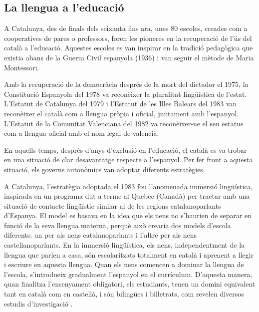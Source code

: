 \begin{multicols}{2}
\subsection{La llengua a l’educació}

A Catalunya, des de finals dels seixanta fins ara, unes 80 escoles, creades com a cooperatives de pares o professors, foren les pioneres en la recuperació de l’ús del català a l’educació. Aquestes escoles es van inspirar en la tradició pedagògica que existia abans de la Guerra Civil espanyola (1936) i van seguir el mètode de Maria Montessori.

Amb la recuperació de la democràcia després de la mort del dictador el 1975, la Constitució Espanyola del 1978 va reconèixer la pluralitat lingüística de l’estat. L’Estatut de Catalunya del 1979 i l’Estatut de les Illes Balears del 1983 van reconèixer el català com a llengua pròpia i oficial, juntament amb l’espanyol. L’Estatut de la Comunitat Valenciana del 1982 va reconèixer-ne el seu estatus com a llengua oficial amb el nom legal de valencià.

En aquells temps, després d’anys d’ex\-clu\-sió en l’educació, el català es va trobar en una situació de clar desavantatge respecte a l’espanyol. Per fer front a aquesta situació, els governs autonòmics van adoptar diferents estratègies.

A Catalunya, l’estratègia adoptada el 1983 fou l’anomenada immersió lingüística, inspirada en un programa dut a terme al Quebec (Canadà) per tractar amb una situació de contacte lingüístic similar al de les regions catalanoparlants d’Espanya. El model es basava en la idea que els nens no s’haurien de separar en funció de la seva llengua materna, perquè això crearia dos models d’escola diferents: un per als nens catalanoparlants i l’altre per als nens castellanoparlants. En la immersió lingüística, els nens, independentment de la llengua que parlen a casa, són escolaritzats totalment en català i aprenent a llegir i escriure en aquesta llengua. Quan els nens comencen a dominar la llengua de l’escola, s’introdueix gradualment l’espanyol en el currículum. D’aquesta manera, quan finalitza l’ensenyament obligatori, els estudiants, tenen un domini equivalent tant en català com en castellà, i són bilingües i billetrats, com revelen diversos estudis d’investigació \cite{CAT-Nota5}.



\end{multicols}
